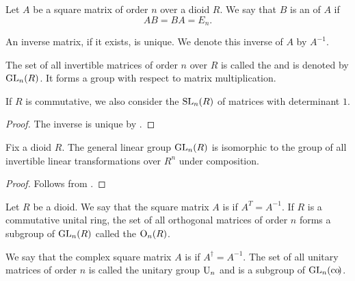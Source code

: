 \begin{definition}\label{def:inverse_matrix}
  Let \( A \) be a square matrix of order \( n \) over a dioid \( R \). We say that \( B \) is an  of \( A \) if
  \begin{equation*}
    AB = BA = E_n.
  \end{equation*}

  An inverse matrix, if it exists, is unique. We denote this inverse of \( A \) by \( A^{-1} \).

  The set of all invertible matrices of order \( n \) over \( R \) is called the  and is denoted by \( \operatorname{GL}_n(R) \). It forms a group with respect to matrix multiplication.

  If \( R \) is commutative, we also consider the  \( \operatorname{SL}_n(R) \) of matrices with determinant \( 1 \).
\end{definition}
\begin{proof}
  The inverse is unique by .
\end{proof}

\begin{proposition}\label{def:general_linear_group_isomorphic_to_automorphism_group}
  Fix a dioid \( R \). The general linear group \( \operatorname{GL}_n(R) \) is isomorphic to the group of all invertible linear transformations over \( R^n \) under composition.
\end{proposition}
\begin{proof}
  Follows from .
\end{proof}

\begin{definition}\label{def:orthogonal_matrix}
  Let \( R \) be a dioid. We say that the square matrix \( A \) is  if \( A^T = A^{-1} \). If \( R \) is a commutative unital ring, the set of all orthogonal matrices of order \( n \) forms a subgroup of \( \operatorname{GL}_n(R) \) called the  \( \operatorname{O}_n(R) \).
\end{definition}

\begin{definition}\label{def:unitary_matrix}
  We say that the complex square matrix \( A \) is  if \( A^\dagger = A^{-1} \). The set of all unitary matrices of order \( n \) is called the unitary group \( \operatorname{U}_n \) and is a subgroup of \( \operatorname{GL}_n(\operatorname{co}\!) \).
\end{definition}

